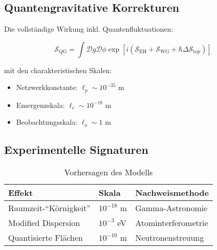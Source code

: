 \subsection{Quantengravitative Korrekturen}
Die vollständige Wirkung inkl. Quantenfluktuationen:

\begin{equation}
    \mathcal{S}_{\text{QG}} = \int \mathcal{D}g\mathcal{D}\phi \exp\left[ i\left( \mathcal{S}_{\text{EH}} + \mathcal{S}_{\text{WG}} + \hbar \Delta \mathcal{S}_{\text{top}} \right) \right]
\end{equation}

mit den charakteristischen Skalen:
\begin{itemize}
    \item Netzwerkkonstante: $\ell_p \sim 10^{-35}$ m
    \item Emergenzskala: $\ell_e \sim 10^{-18}$ m
    \item Beobachtungsskala: $\ell_o \sim 1$ m
\end{itemize}

\subsection{Experimentelle Signaturen}
\begin{table}[h]
    \centering
    \begin{tabular}{lll}
        \toprule
        Effekt & Skala & Nachweismethode \\
        \midrule
        Raumzeit-\enquote{Körnigkeit} & $10^{-18}$ m & Gamma-Astronomie \\
        Modified Dispersion & $10^{-3}$ eV & Atominterferometrie \\
        Quantisierte Flächen & $10^{-10}$ m & Neutronenstreuung \\
        \bottomrule
    \end{tabular}
    \caption{Vorhersagen des Modells}
\end{table}